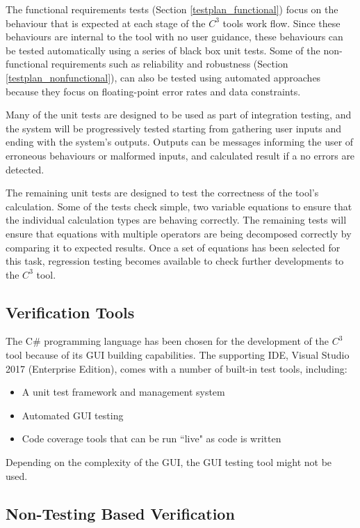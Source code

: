 \documentclass[12pt, titlepage]{article}
\newcommand{\prognameAbbrv}{$C^{3}$}
\begin{document}
The functional requirements tests (Section \ref{testplan_functional}) focus on 
the behaviour that is expected at each stage of the \prognameAbbrv{} tools work 
flow. Since these behaviours are internal to the tool with no user guidance, 
these behaviours can be tested automatically using a series of black box unit 
tests. Some of the non-functional requirements such as reliability and 
robustness (Section \ref{testplan_nonfunctional}), can also be tested using 
automated approaches because they focus on floating-point error rates and data 
constraints.

Many of the unit tests are designed to be used as part of integration testing, 
and the system will be progressively tested starting from gathering user inputs 
and ending with the system's outputs. Outputs can be messages informing the 
user of erroneous behaviours or malformed inputs, and calculated result if a no 
errors are detected.

The remaining unit tests are designed to test the correctness of the tool's 
calculation. Some of the tests check simple, two variable equations to ensure 
that the individual calculation types are behaving correctly. The remaining 
tests will ensure that equations with multiple operators are being decomposed 
correctly by comparing it to expected results. Once a set of equations has been 
selected for this task, regression testing becomes available to check further 
developments to the \prognameAbbrv{} tool.

\subsection{Verification Tools}
The C\# programming language has been chosen for the development of the 
\prognameAbbrv{} tool because of its GUI building capabilities. The supporting 
IDE, Visual Studio 2017 (Enterprise Edition), comes with a number of built-in 
test tools, including:

\begin{itemize}
	\item A unit test framework and management system
	\item Automated GUI testing
	\item Code coverage tools that can be run ``live" as code is written
\end{itemize}

Depending on the complexity of the GUI, the GUI testing tool might not be used.

\subsection{Non-Testing Based Verification}
\end{document}
